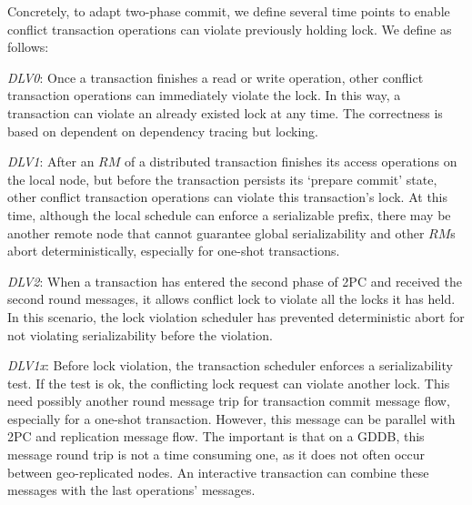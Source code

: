 \documentclass[conference]{IEEEtran}
\begin{document}
Concretely, to adapt two-phase commit, we define several time points to enable conflict transaction operations can violate previously holding lock.
We define as follows:

\emph{DLV0}: 
Once a transaction finishes a read or write operation, other conflict transaction operations can immediately violate the lock.
In this way, a transaction can violate an already existed lock at any time.
The correctness is based on dependent on dependency tracing but locking.

\emph{DLV1}: 
After an ${RM}$ of a distributed transaction finishes its access operations on the local node, but before the transaction persists its `prepare commit' state, other conflict transaction operations can violate this transaction's lock.
At this time, although the local schedule can enforce a serializable prefix, there may be another remote node that cannot guarantee global serializability and other ${RM}$s abort deterministically, especially for one-shot transactions.

\emph{DLV2}: 
When a transaction has entered the second phase of 2PC and received the second round messages, it allows conflict lock to violate all the locks it has held.
In this scenario, the lock violation scheduler has prevented deterministic abort for not violating serializability before the violation.

\emph{DLV1x}: 
Before lock violation, the transaction scheduler enforces a serializability test.
If the test is ok, the conflicting lock request can violate another lock.
This need possibly another round message trip for transaction commit message flow, especially for a one-shot transaction.
However, this message can be parallel with 2PC and replication message flow.
The important is that on a GDDB,  this message round trip is not a time consuming one, as it does not often occur between geo-replicated nodes.
An interactive transaction can combine these messages with the last operations' messages.
\end{document}
